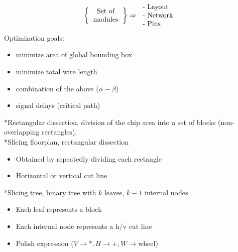 $$
\left\{\begin{tabular}{c}
    Set of \\ modules
\end{tabular}\right\}
\Rightarrow
\begin{tabular}{l}
- Layout \\
- Network \\
- Pins
\end{tabular}
$$
Optimization goals:
\begin{itemize}
  \item minimize area of global bounding box
  \item minimize total wire length
  \item combination of the above ($\alpha-\beta$)
  \item signal delays (critical path)
\end{itemize}
*Rectangular dissection, division of the chip area into a set of blocks
(non-overlapping rectangles).\\
*Slicing floorplan, rectangular dissection
\begin{itemize}
  \item Obtained by repeatedly dividing each rectangle
  \item Horizontal or vertical cut line
\end{itemize}
*Slicing tree, binary tree with $k$ leaves, $k-1$ internal nodes
\begin{itemize}
  \item Each leaf represents a block
  \item Each internal node represents a h/v cut line
  \item Polish expression ($V \rightarrow *, H \rightarrow +, W \rightarrow \text{wheel}$)
\end{itemize}
